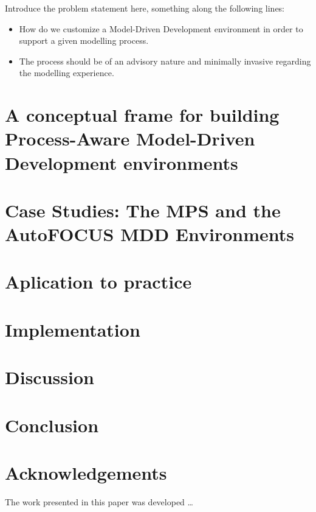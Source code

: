 

Introduce the problem statement here, something along the following
lines: 

\begin{itemize}
  \item How do we customize a Model-Driven Development environment in order to
  support a given modelling process.
  \item The process should be of an advisory nature and minimally invasive
  regarding the modelling experience.
\end{itemize} 

\section{A conceptual frame for building Process-Aware Model-Driven
Development environments}
\label{sec:meta}
 

\section{Case Studies: The MPS and the AutoFOCUS MDD Environments}


\section{Aplication to practice}
 

\section{Implementation}


\section{Discussion}

\section{Conclusion} 

\section*{Acknowledgements}
The work presented in this paper was developed \ldots






